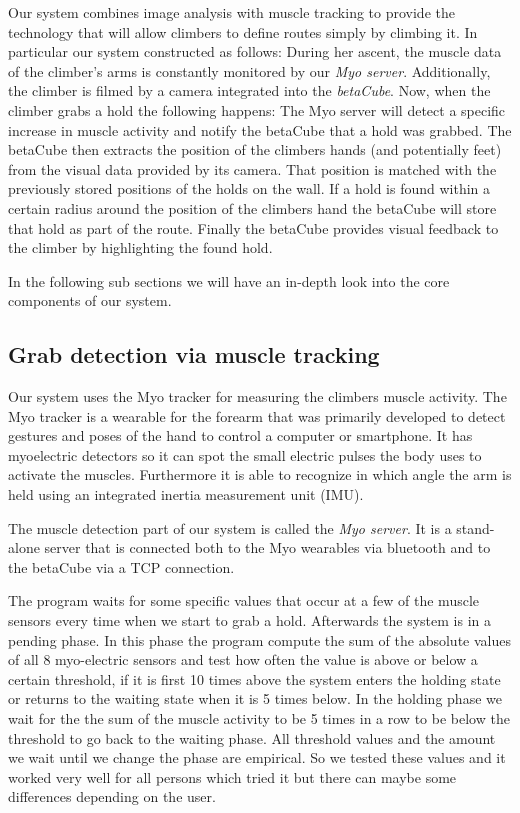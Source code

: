 Our system combines image analysis with muscle tracking to provide the technology that will allow climbers to define routes simply by climbing it.
In particular our system constructed as follows:
During her ascent, the muscle data of the climber's arms is constantly monitored by our \emph{Myo server}.
Additionally, the climber is filmed by a camera integrated into the \emph{betaCube}.
Now, when the climber grabs a hold the following happens:
The Myo server will detect a specific increase in muscle activity and notify the betaCube that a hold was grabbed.
The betaCube then extracts the position of the climbers hands (and potentially feet) from the visual data provided by its camera.
That position is matched with the previously stored positions of the holds on the wall.
If a hold is found within a certain radius around the position of the climbers hand the betaCube will store that hold as part of the route.
Finally the betaCube provides visual feedback to the climber by highlighting the found hold.

In the following sub sections we will have an in-depth look into the core components of our system.

\subsection{Grab detection via muscle tracking}
Our system uses the Myo tracker for measuring the climbers muscle activity.
The Myo tracker is a wearable for the forearm that was primarily developed to detect gestures and poses of the hand to control a computer or smartphone.
It has myoelectric detectors so it can spot the small electric pulses the body uses to activate the muscles.
Furthermore it is able to recognize in which angle the arm is held using an integrated inertia measurement unit (IMU).

The muscle detection part of our system is called the \emph{Myo server}.
It is a stand-alone server that is connected both to the Myo wearables via bluetooth and to the betaCube via a TCP connection.

The program waits for some specific values that occur at a few of the muscle sensors every time when we start to grab a hold.
Afterwards the system is in a pending phase.
In this phase the program compute the sum of the absolute values of all 8 myo-electric sensors and test how often the value is above or below a certain threshold, if it is first 10 times above the system enters the holding state or returns to the waiting state when it is 5 times below.
In the holding phase we wait for the the sum of the muscle activity to be 5 times in a row to be below the threshold to go back to the waiting phase.
All threshold values and the amount we wait until we change the phase are empirical.
So we tested these values and it worked very well for all persons which tried it but there can maybe some differences depending on the user.


